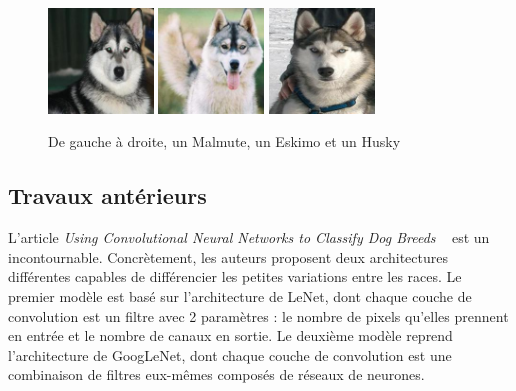 \documentclass{article}
\begin{document}
\begin{figure}[htbp]
    \centering
    \includegraphics[width=2.8cm]{../dataset/test/n02110063-malamute/n02110063_11838.jpg}\hfill 
    \includegraphics[width=2.8cm]{../dataset/test/n02109961-Eskimo_dog/n02109961_623.jpg}\hfill 
    \includegraphics[width=2.8cm]{../dataset/test/n02110185-Siberian_husky/n02110185_7564.jpg} 
    \caption{De gauche à droite, un Malmute, un Eskimo et un Husky}
    \label{1} 
\end{figure} 

\subsection{Travaux antérieurs}
L'article \textit{Using Convolutional Neural Networks to Classify Dog Breeds}
~\cite{fcdh_FinalReport} est un incontournable. Concrètement, les auteurs
proposent  deux architectures différentes capables de différencier les petites
variations entre les races. Le premier modèle est basé sur l'architecture de 
LeNet, dont chaque couche de convolution est un filtre avec 2 paramètres : le 
nombre de pixels qu’elles prennent en entrée et le nombre de canaux en sortie.
Le deuxième modèle reprend l'architecture de GoogLeNet, dont chaque couche de
convolution est une combinaison de filtres eux-mêmes composés de réseaux de
neurones.
\end{document}
